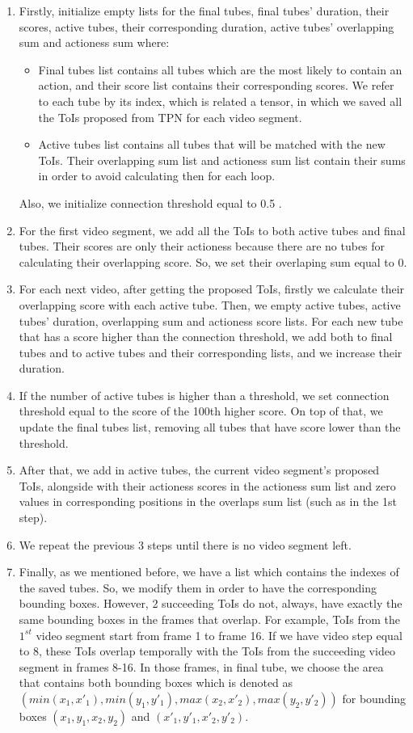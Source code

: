 \begin{enumerate}
\item Firstly,  initialize empty lists for the final tubes, final tubes' duration, their scores, active tubes, their corresponding duration,
  active tubes' overlapping sum and actioness sum where:
  \begin{itemize}
  \item Final tubes list contains all tubes which are the most likely to contain an action, and their score list contains their
    corresponding scores. We refer to each tube by its index, which is related a tensor, in which we saved all the ToIs proposed
    from TPN for each video segment.
  \item Active tubes list contains all tubes that will be matched with the new ToIs. Their overlapping sum list and actioness sum list
    contain their sums in order to avoid calculating then for each loop. 
  \end{itemize}
Also, we initialize  connection threshold equal to 0.5 .
\item For the first video segment, we add all the ToIs to both active tubes and final tubes. Their scores are only their actioness because
  there are no tubes for calculating their overlapping score. So, we set their overlaping sum equal to 0.
\item For each next video, after getting the proposed ToIs, firstly we calculate their overlapping score with each active tube. Then, we
  empty active tubes, active tubes' duration, overlapping sum and actioness score lists.  For each new tube that has a score higher than the
  connection threshold,  we add both to final tubes and to active tubes and their corresponding lists, and we increase their duration.
\item If the number of active tubes is higher than a threshold, we set connection threshold equal to the score of
  the 100th higher score. On top of that, we update the final tubes list, removing all tubes that have score lower than the threshold.
\item After that, we add in active tubes, the current video segment's proposed ToIs, alongside with their actioness scores in the  actioness sum list and
  zero values in corresponding positions in the overlaps sum list (such as in the 1st step).
\item We repeat the previous 3 steps until there is no video segment left.
\item Finally, as we mentioned before, we have a list which contains the indexes of the saved tubes. So, we modify them in order to have
  the corresponding bounding boxes. However, 2 succeeding ToIs do not, always, have exactly the same bounding boxes in the frames that overlap. For example,
  ToIs from the $1^{st}$ video segment start from frame 1 to frame 16. If we have video step equal to 8, these ToIs overlap temporally
  with the ToIs from the  succeeding video segment in frames 8-16. In those frames, in final tube, we choose the area that contains both bounding boxes which is
  denoted as $(min(x_1,x'_1), min(y_1,y'_1), max(x_2,x'_2), max(y_2,y'_2))$ for bounding boxes $(x_1,y_1,x_2,y_2)$ and $(x'_1,y'_1,x'_2,y'_2)$.
\end{enumerate}
